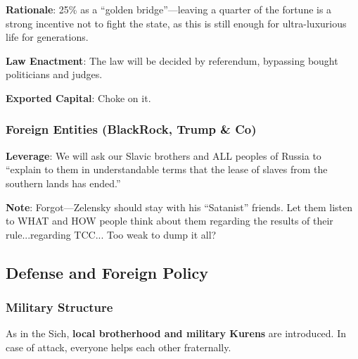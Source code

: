 \documentclass[11pt,a4paper]{article}
\theoremstyle{definition}
\theoremstyle{remark}
\begin{document}
\textbf{Rationale}: 25\% as a ``golden bridge''—leaving a quarter of the fortune is a strong incentive not to fight the state, as this is still enough for ultra-luxurious life for generations.

\textbf{Law Enactment}: The law will be decided by referendum, bypassing bought politicians and judges.

\textbf{Exported Capital}: Choke on it.

\subsubsection{Foreign Entities (BlackRock, Trump \& Co)}

\begin{center}
\end{center}

\textbf{Leverage}: We will ask our Slavic brothers and ALL peoples of Russia to ``explain to them in understandable terms that the lease of slaves from the southern lands has ended.''

\textbf{Note}: Forgot—Zelensky should stay with his ``Satanist'' friends. Let them listen to WHAT and HOW people think about them regarding the results of their rule...regarding TCC... Too weak to dump it all?

\subsection{Defense and Foreign Policy}

\subsubsection{Military Structure}

As in the Sich, \textbf{local brotherhood and military Kurens} are introduced. In case of attack, everyone helps each other fraternally.
\end{document}
